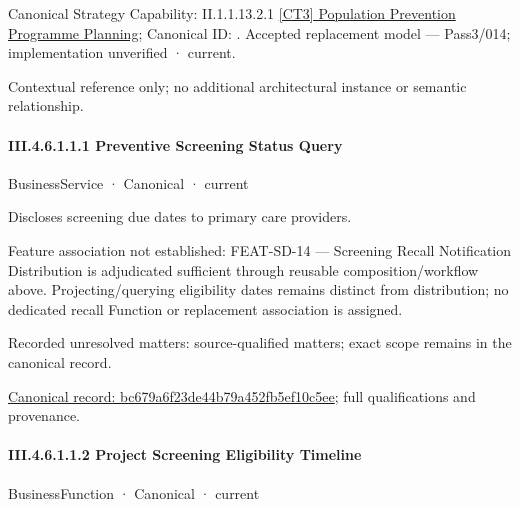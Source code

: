 {\small Canonical Strategy Capability: II.1.1.13.2.1 \hyperref[element:5e440d45f96e47a29981efa4e7153a9d]{[CT3] Population Prevention Programme Planning}; Canonical ID: \texttt{}. Accepted replacement model — Pass3/014; implementation unverified · current.}\par
Contextual reference only; no additional architectural instance or semantic relationship.\par
\paragraph*{III.4.6.1.1.1 Preventive Screening Status Query}
\label{navigation:III.4.6.1.1.1}

\label{element:bc679a6f23de44b79a452fb5ef10c5ee}
{\small BusinessService · Canonical · current}\par

Discloses screening due dates to primary care providers.



Feature association not established: FEAT-SD-14 — Screening Recall Notification Distribution is adjudicated sufficient through reusable composition/workflow above. Projecting/querying eligibility dates remains distinct from distribution; no dedicated recall Function or replacement association is assigned.


{\small Recorded unresolved matters: source-qualified matters; exact scope remains in the canonical record.}\par
{\footnotesize \href{../../../../../../../../continuum/business/business-service/bc679a6f23de44b79a452fb5ef10c5ee.md}{Canonical record: bc679a6f23de44b79a452fb5ef10c5ee}; full qualifications and provenance.}\par
\paragraph*{III.4.6.1.1.2 Project Screening Eligibility Timeline}
\label{navigation:III.4.6.1.1.2}

\label{element:afb08bdb99cd41d3a86ef7bf7ad5e92d}
{\small BusinessFunction · Canonical · current}\par

